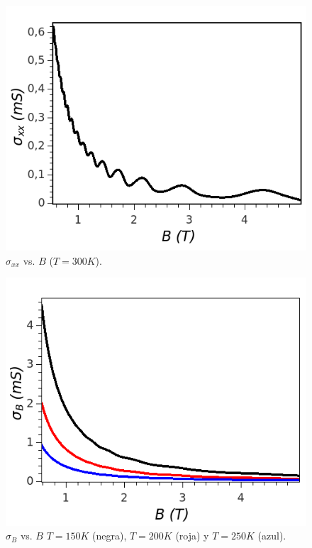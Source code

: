 \begin{frame}
  \begin{figure}[h!]
    \begin{center}
      \includegraphics[scale=0.5]{graficas/fig6.png}
      \caption{$\sigma_{xx}$ vs. $B$ ($T = 300 K$).}
      \label{sigma300k}
      \centering
    \end{center}
  \end{figure}
\end{frame}

\begin{frame}
  \begin{figure}[h!]
    \begin{center}
      \includegraphics[scale=0.5]{graficas/fig8.png}
      \caption{$\sigma_{B}$ vs. $B$ $T = 150 K$ (negra), $T = 200 K$ (roja) y $T = 250 K$ (azul).}
      \label{cont_Boltz}
      \centering
    \end{center}
  \end{figure}
\end{frame}

